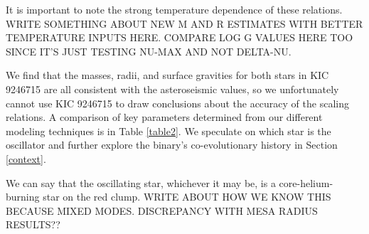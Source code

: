 

It is important to note the strong temperature dependence of these relations. WRITE SOMETHING ABOUT NEW M AND R ESTIMATES WITH BETTER TEMPERATURE INPUTS HERE. COMPARE LOG G VALUES HERE TOO SINCE IT'S JUST TESTING NU-MAX AND NOT DELTA-NU.

We find that the masses, radii, and surface gravities for both stars in KIC 9246715 are all consistent with the asteroseismic values, so we unfortunately cannot use KIC 9246715 to draw conclusions about the accuracy of the scaling relations. A comparison of key parameters determined from our different modeling techniques is in Table \ref{table2}. We speculate on which star is the oscillator and further explore the binary's co-evolutionary history in Section \ref{context}.

We can say that the oscillating star, whichever it may be, is a core-helium-burning star on the red clump. WRITE ABOUT HOW WE KNOW THIS BECAUSE MIXED MODES. DISCREPANCY WITH MESA RADIUS RESULTS??

  
  
  
  
  
  
  
  
  
  
  
  
  
  
  
  
  
  
  
  
  
  